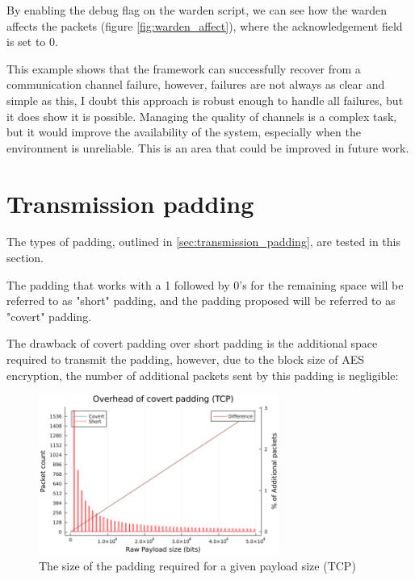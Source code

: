 By enabling the debug flag on the warden script, we can see how the warden affects the packets (figure \ref{fig:warden_affect}), where the acknowledgement field is set to 0.

\clearpage

This example shows that the framework can successfully recover from a communication channel failure, however, failures are not always as clear and simple as this, I doubt this approach is robust enough to handle all failures, but it does show it is possible. Managing the quality of channels is a complex task, but it would improve the availability of the system, especially when the environment is unreliable. This is an area that could be improved in future work.

\section{Transmission padding}
\label{sec:padding_testing}

The types of padding, outlined in \ref{sec:transmission_padding}, are tested in this section.

The padding that works with a 1 followed by 0's for the remaining space will be referred to as "short" padding, and the padding proposed will be referred to as "covert" padding.

The drawback of covert padding over short padding is the additional space required to transmit the padding, however, due to the block size of AES encryption, the number of additional packets sent by this padding is negligible:

\begin{figure}[h]
    \centering
    \includegraphics[width=0.7\textwidth]{fig/padding_size_TCP.png}
    \caption{The size of the padding required for a given payload size (TCP)}
    \label{fig:padding_size_TCP}
\end{figure}

